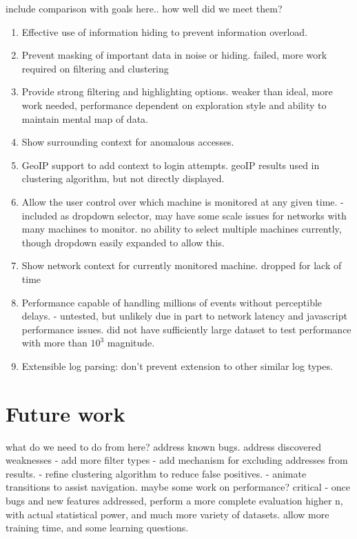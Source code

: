 include comparison with goals here.. how well did we meet them?
\begin{enumerate}
\item{Effective use of information hiding to prevent information overload.}
\item{Prevent masking of important data in noise or hiding. failed, more work required on filtering and clustering}
\item{Provide strong filtering and highlighting options. weaker than ideal, more work needed, performance dependent on exploration style and ability to maintain mental map of data.}
\item{Show surrounding context for anomalous accesses.}
\item{GeoIP support to add context to login attempts. geoIP results used in clustering algorithm, but not directly displayed.}
\item{Allow the user control over which machine is monitored at any given time. -included as dropdown selector, may have some scale issues for networks with many machines to monitor. no ability to select multiple machines currently, though dropdown easily expanded to allow this.}
\item{Show network context for currently monitored machine. dropped for lack of time}
\item{Performance capable of handling millions of events without perceptible delays. - untested, but unlikely due in part to network latency and javascript performance issues. did not have sufficiently large dataset to test performance with more than $10^3$ magnitude.}
\item{Extensible log parsing: don't prevent extension to other similar log types.}
\end{enumerate}

\section{Future work}
what do we need to do from here?
address known bugs.
address discovered weaknesses
 - add more filter types
 - add mechanism for excluding addresses from results.
 - refine clustering algorithm to reduce false positives. 
 - animate transitions to assist navigation.
maybe some work on performance?
critical - once bugs and new features addressed, perform a more complete evaluation
higher n, with actual statistical power, and much more variety of datasets. allow more training time, and some learning questions.